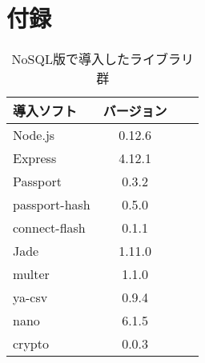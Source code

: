\documentclass[12pt]{sotsuron}
\begin{document}
\section*{付録}
\begin{table}[htb]
	\caption{NoSQL版で導入したライブラリ群}
	\begin{center}
	\begin{tabular}{|l|c|r|r|}\hline
	導入ソフト & バージョン \\ \hline \hline
	Node.js & 0.12.6 \\ \hline
	Express & 4.12.1 \\ \hline
	Passport & 0.3.2 \\ \hline
	passport-hash & 0.5.0 \\ \hline
	connect-flash & 0.1.1 \\ \hline
	Jade & 1.11.0 \\ \hline
	multer & 1.1.0  \\ \hline
	ya-csv & 0.9.4 \\ \hline
	nano & 6.1.5 \\ \hline
	crypto & 0.0.3  \\ \hline


	\end{tabular}
	\end{center}


\end{table}
\end{document}
